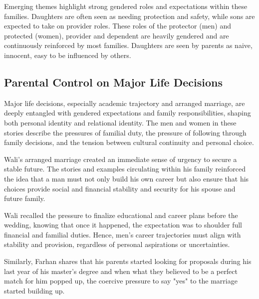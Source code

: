 Emerging themes highlight strong gendered roles and expectations within these families. Daughters are often seen as needing protection and safety, while sons are expected to take on provider roles. These roles of the protector (men) and protected (women), provider and dependent are heavily gendered and are continuously reinforced by most families. Daughters are seen by parents as naive, innocent, easy to be influenced by others.

\subsection{Parental Control on Major Life Decisions}

Major life decisions, especially academic trajectory and arranged marriage, are deeply entangled with gendered expectations and family responsibilities, shaping both personal identity and relational identity. The men and women in these stories describe the pressures of familial duty, the pressure of following through family decisions, and the tension between cultural continuity and personal choice. 

Wali's arranged marriage created an immediate sense of urgency to secure a stable future. The stories and examples circulating within his family reinforced the idea that a man must not only build his own career but also ensure that his choices provide social and financial stability and security for his spouse and future family. 

Wali recalled the pressure to finalize educational and career plans before the wedding, knowing that once it happened, the expectation was to shoulder full financial and familial duties. Hence, men’s career trajectories must align with stability and provision, regardless of personal aspirations or uncertainties.

Similarly, Farhan shares that his parents started looking for proposals during his last year of his master's degree and when what they believed to be a perfect match for him popped up, the coercive pressure to say "yes" to the marriage started building up.

